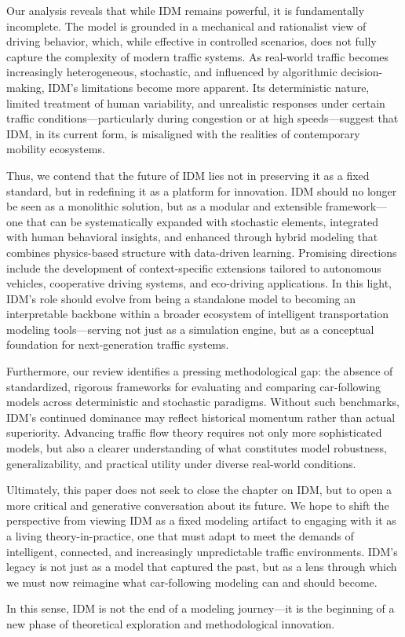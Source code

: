 \documentclass[a4paper,fleqn,11pt]{reviewresponse}
\renewenvironment{quotation}
  {\begingroup\color{customblue}%
   \captionsetup{labelfont={bf},textfont={color=customblue},font={color=customblue}}%
   \list{}{\leftmargin=0em \rightmargin=0em} %
   \item\relax\small}
  {\endlist\endgroup}
\begin{document}
\begin{quotation}
Our analysis reveals that while IDM remains powerful, it is fundamentally incomplete. The model is grounded in a mechanical and rationalist view of driving behavior, which, while effective in controlled scenarios, does not fully capture the complexity of modern traffic systems. As real-world traffic becomes increasingly heterogeneous, stochastic, and influenced by algorithmic decision-making, IDM’s limitations become more apparent. Its deterministic nature, limited treatment of human variability, and unrealistic responses under certain traffic conditions—particularly during congestion or at high speeds—suggest that IDM, in its current form, is misaligned with the realities of contemporary mobility ecosystems.

Thus, we contend that the future of IDM lies not in preserving it as a fixed standard, but in redefining it as a platform for innovation. IDM should no longer be seen as a monolithic solution, but as a modular and extensible framework—one that can be systematically expanded with stochastic elements, integrated with human behavioral insights, and enhanced through hybrid modeling that combines physics-based structure with data-driven learning. Promising directions include the development of context-specific extensions tailored to autonomous vehicles, cooperative driving systems, and eco-driving applications. In this light, IDM’s role should evolve from being a standalone model to becoming an interpretable backbone within a broader ecosystem of intelligent transportation modeling tools—serving not just as a simulation engine, but as a conceptual foundation for next-generation traffic systems.

Furthermore, our review identifies a pressing methodological gap: the absence of standardized, rigorous frameworks for evaluating and comparing car-following models across deterministic and stochastic paradigms. Without such benchmarks, IDM’s continued dominance may reflect historical momentum rather than actual superiority. Advancing traffic flow theory requires not only more sophisticated models, but also a clearer understanding of what constitutes model robustness, generalizability, and practical utility under diverse real-world conditions.

Ultimately, this paper does not seek to close the chapter on IDM, but to open a more critical and generative conversation about its future. We hope to shift the perspective from viewing IDM as a fixed modeling artifact to engaging with it as a living theory-in-practice, one that must adapt to meet the demands of intelligent, connected, and increasingly unpredictable traffic environments. IDM’s legacy is not just as a model that captured the past, but as a lens through which we must now reimagine what car-following modeling can and should become.

In this sense, IDM is not the end of a modeling journey—it is the beginning of a new phase of theoretical exploration and methodological innovation.
\end{quotation}
\end{document}
